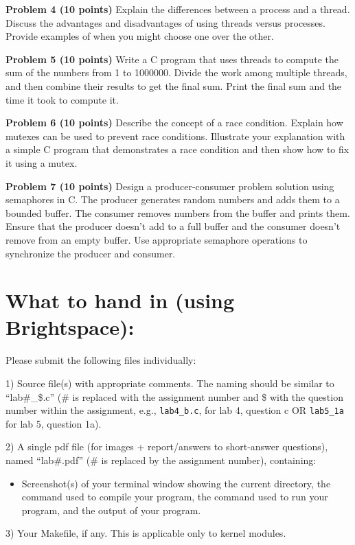\documentclass{article}
\begin{document}
\textbf{Problem 4 (10 points)}  Explain the differences between a process and a thread.  Discuss the advantages and disadvantages of using threads versus processes. Provide examples of when you might choose one over the other.


\textbf{Problem 5 (10 points)} Write a C program that uses threads to compute the sum of the numbers from 1 to 1000000. Divide the work among multiple threads, and then combine their results to get the final sum.  Print the final sum and the time it took to compute it.


\textbf{Problem 6 (10 points)} Describe the concept of a race condition. Explain how mutexes can be used to prevent race conditions.  Illustrate your explanation with a simple C program that demonstrates a race condition and then show how to fix it using a mutex.


\textbf{Problem 7 (10 points)}  Design a producer-consumer problem solution using semaphores in C. The producer generates random numbers and adds them to a bounded buffer. The consumer removes numbers from the buffer and prints them.  Ensure that the producer doesn't add to a full buffer and the consumer doesn't remove from an empty buffer. Use appropriate semaphore operations to synchronize the producer and consumer.


\section*{What to hand in (using Brightspace):}

Please submit the following files individually:

1) Source file(s) with appropriate comments. The naming should be similar to “lab\#\_\$.c” (\# is replaced with the assignment number and \$ with the question number within the assignment, e.g., \texttt{lab4\_b.c}, for lab 4, question c OR \texttt{lab5\_1a} for lab 5, question 1a).

2) A single pdf file (for images + report/answers to short-answer questions), named “lab\#.pdf” (\# is replaced by the assignment number), containing:
    \begin{itemize}
        \item Screenshot(s) of your terminal window showing the current directory, the command used to compile your program, the command used to run your program, and the output of your program.
    \end{itemize}

3) Your Makefile, if any. This is applicable only to kernel modules.
\end{document}
